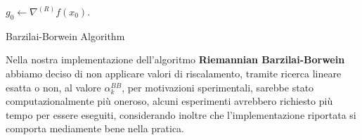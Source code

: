 \documentclass[a4paper, 12pt]{article}
\begin{document}
\begin{center}
\begin{algorithm}[H]
\SetAlgoLined
{}
$g_0 \leftarrow \nabla^{(R)} f(x_0)$.\\
\caption{Barzilai-Borwein Algorithm}
\end{algorithm}
\end{center}
Nella nostra implementazione dell'algoritmo \textbf{Riemannian Barzilai-Borwein} abbiamo deciso di non applicare valori di riscalamento, tramite ricerca lineare esatta o non, al valore $\alpha_k^{BB}$, per motivazioni sperimentali, sarebbe stato computazionalmente più oneroso, alcuni esperimenti avrebbero richiesto più tempo per essere eseguiti, considerando inoltre che l'implementazione riportata si comporta mediamente bene nella pratica.
\end{document}
